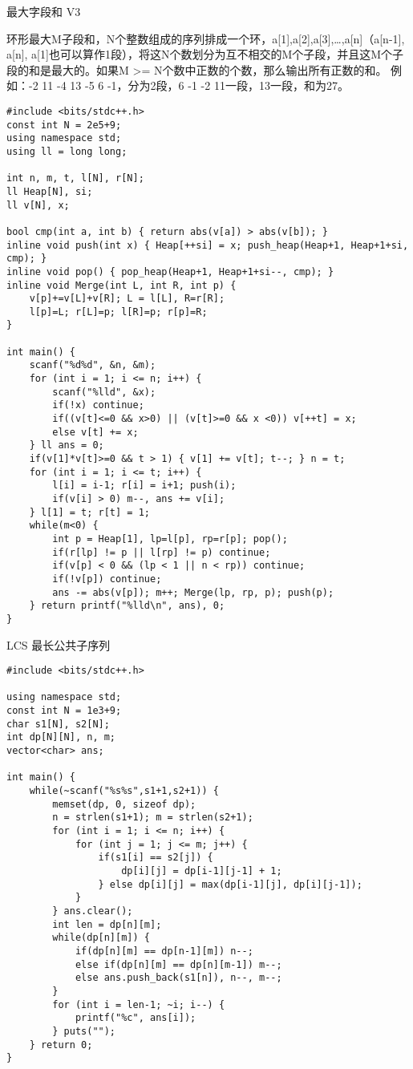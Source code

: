 最大字段和 V3

环形最大M子段和，N个整数组成的序列排成一个环，a[1],a[2],a[3],…,a[n]（a[n-1], a[n], a[1]也可以算作1段），将这N个数划分为互不相交的M个子段，并且这M个子段的和是最大的。如果M >= N个数中正数的个数，那么输出所有正数的和。
例如：-2 11 -4 13 -5 6 -1，分为2段，6 -1 -2 11一段，13一段，和为27。


\begin{lstlisting}
#include <bits/stdc++.h>
const int N = 2e5+9;
using namespace std;
using ll = long long;

int n, m, t, l[N], r[N];
ll Heap[N], si;
ll v[N], x;

bool cmp(int a, int b) { return abs(v[a]) > abs(v[b]); }
inline void push(int x) { Heap[++si] = x; push_heap(Heap+1, Heap+1+si, cmp); }
inline void pop() { pop_heap(Heap+1, Heap+1+si--, cmp); }
inline void Merge(int L, int R, int p) {
    v[p]+=v[L]+v[R]; L = l[L], R=r[R];
    l[p]=L; r[L]=p; l[R]=p; r[p]=R;
}

int main() {
    scanf("%d%d", &n, &m);
    for (int i = 1; i <= n; i++) {
        scanf("%lld", &x);
        if(!x) continue;
        if((v[t]<=0 && x>0) || (v[t]>=0 && x <0)) v[++t] = x;
        else v[t] += x;
    } ll ans = 0;
    if(v[1]*v[t]>=0 && t > 1) { v[1] += v[t]; t--; } n = t;
    for (int i = 1; i <= t; i++) {
        l[i] = i-1; r[i] = i+1; push(i);
        if(v[i] > 0) m--, ans += v[i];
    } l[1] = t; r[t] = 1;
    while(m<0) {
        int p = Heap[1], lp=l[p], rp=r[p]; pop();
        if(r[lp] != p || l[rp] != p) continue;
        if(v[p] < 0 && (lp < 1 || n < rp)) continue;
        if(!v[p]) continue;
        ans -= abs(v[p]); m++; Merge(lp, rp, p); push(p);
    } return printf("%lld\n", ans), 0;
}
\end{lstlisting}

LCS 最长公共子序列

\begin{lstlisting}
#include <bits/stdc++.h>

using namespace std;
const int N = 1e3+9;
char s1[N], s2[N];
int dp[N][N], n, m;
vector<char> ans;

int main() {
    while(~scanf("%s%s",s1+1,s2+1)) {
        memset(dp, 0, sizeof dp);
        n = strlen(s1+1); m = strlen(s2+1);
        for (int i = 1; i <= n; i++) {
            for (int j = 1; j <= m; j++) {
                if(s1[i] == s2[j]) {
                    dp[i][j] = dp[i-1][j-1] + 1;
                } else dp[i][j] = max(dp[i-1][j], dp[i][j-1]);
            }
        } ans.clear();
        int len = dp[n][m];
        while(dp[n][m]) {
            if(dp[n][m] == dp[n-1][m]) n--;
            else if(dp[n][m] == dp[n][m-1]) m--;
            else ans.push_back(s1[n]), n--, m--;
        }
        for (int i = len-1; ~i; i--) {
            printf("%c", ans[i]);
        } puts("");
    } return 0;
}
\end{lstlisting}



